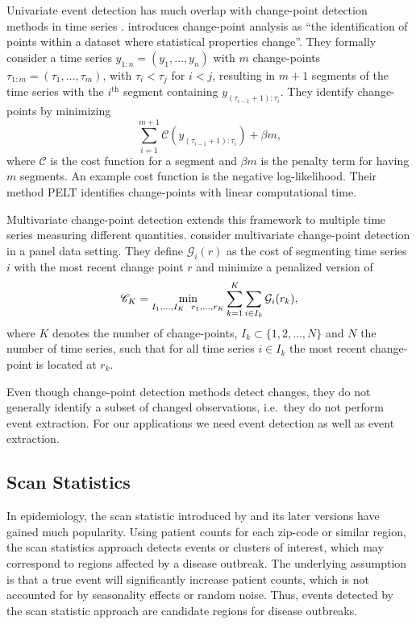 \documentclass[a4paper,11pt]{article}
\begin{document}
Univariate event detection has much overlap with change-point detection methods in time series \citep{guralnik1999event}. \cite{killick2012optimal} introduces change-point analysis as ``the identification of points within a dataset where statistical properties change''. They formally consider a time series $y_{1:n} = (y_1, \ldots , y_n)$ with $m$ change-points $\tau_{1:m} = (\tau_1, \ldots , \tau_m)$, with $\tau_i < \tau_j$ for $i < j$, resulting in $m+1$ segments of the time series with the $i^{\text{th}}$ segment containing $y_{(\tau_{i-1}+1):\tau_i}$. They identify change-points by minimizing
\[
	\sum_{i=1}^{m+1} {\mathcal{C}(y_{(\tau_{i-1}+1):\tau_i})} + \beta m  ,
\]
where $\mathcal{C}$ is the cost function for a segment and $\beta m$ is the penalty term for having $m$ segments. An example cost function is the negative log-likelihood. Their method PELT identifies change-points with linear computational time.

Multivariate change-point detection extends this framework to multiple time series measuring different quantities. \cite{bardwell2019most} consider multivariate change-point detection in a panel data setting. They define $\mathcal{G}_i(r)$ as the cost of segmenting time series $i$ with the most recent change point $r$ and minimize a penalized version of
\[
	\mathscr{C}_K = \min_{I_1, \ldots, I_K \hspace{2mm} r_1, \ldots, r_K}\sum_{k=1}^K \sum_{i \in I_k} \mathcal{G}_i(r_k)  ,
\]
where $K$ denotes the number of change-points, $I_k \subset \{1, 2, \ldots, N \}$ and $N$ the number of time series, such that for all time series $i \in I_k$ the most recent change-point is located at $r_k$.

Even though change-point detection methods detect changes, they do not generally identify a subset of changed observations, i.e.\ they do not perform event extraction. For our applications we need event detection as well as event extraction.

\subsection{Scan Statistics}\label{subsec:ScanStatistics}

In epidemiology, the scan statistic introduced by \cite{kulldorff1997spatial} and its later versions \citep{kulldorff2001prospective, neill2012fast} have gained much popularity. Using patient counts for each zip-code or similar region, the scan statistics approach detects events or clusters of interest, which may correspond to regions affected by a disease outbreak. The underlying assumption is that a true event will significantly increase patient counts, which is not accounted for by seasonality effects or random noise. Thus, events detected by the scan statistic approach are candidate regions for disease outbreaks.
\end{document}
